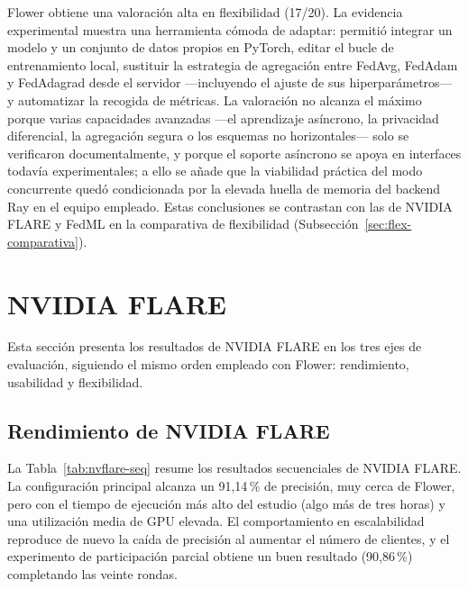 Flower obtiene una valoración alta en flexibilidad (17/20). La
evidencia experimental muestra una herramienta cómoda de adaptar:
permitió integrar un modelo y un conjunto de datos propios en PyTorch, editar el
bucle de entrenamiento local, sustituir la estrategia de agregación entre FedAvg,
FedAdam y FedAdagrad desde el servidor —incluyendo el ajuste de sus
hiperparámetros— y automatizar la recogida de métricas. La valoración no alcanza
el máximo porque varias capacidades avanzadas —el aprendizaje asíncrono, la
privacidad diferencial, la agregación segura o los esquemas no horizontales— solo se
verificaron documentalmente, y porque el soporte asíncrono se apoya en interfaces
todavía experimentales; a ello se añade que la viabilidad práctica del modo
concurrente quedó condicionada por la elevada huella de memoria del backend Ray en
el equipo empleado. Estas conclusiones se contrastan con las de NVIDIA FLARE y FedML
en la comparativa de flexibilidad (Subsección~\ref{sec:flex-comparativa}).


\section{NVIDIA FLARE}\label{sec:nvflare}

Esta sección presenta los resultados de NVIDIA FLARE en los tres ejes de
evaluación, siguiendo el mismo orden empleado con Flower: rendimiento, usabilidad y
flexibilidad.

\subsection{Rendimiento de NVIDIA FLARE}\label{sec:resultados-nvflare}

La Tabla~\ref{tab:nvflare-seq} resume los resultados secuenciales de NVIDIA FLARE. La
configuración principal alcanza un 91{,}14\,\% de precisión, muy cerca de Flower, pero con el
tiempo de ejecución más alto del estudio (algo más de tres horas) y una utilización media de GPU
elevada. El comportamiento en escalabilidad reproduce de nuevo la caída de precisión al
aumentar el número de clientes, y el experimento de participación parcial obtiene un buen
resultado (90{,}86\,\%) completando las veinte rondas.

